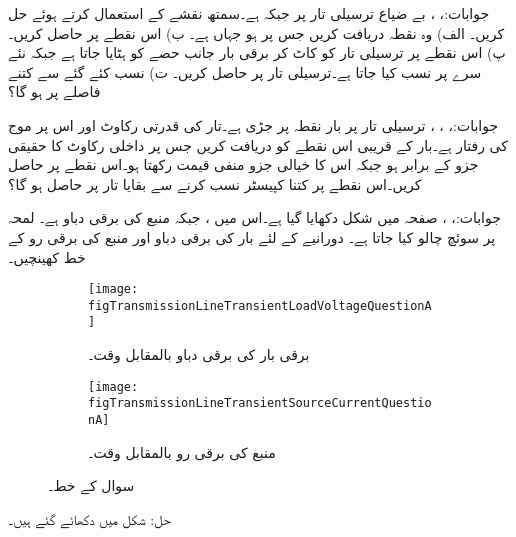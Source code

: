 جوابات:، ، 
بے ضیاع ترسیلی تار پر  جبکہ  ہے۔سمتھ نقشے کے استعمال کرتے ہوئے حل کریں۔ الف) وہ نقطہ دریافت کریں جس پر  ہو جہاں  ہے۔ ب) اس نقطے پر  حاصل کریں۔ پ) اس نقطے پر ترسیلی تار کو کاٹ کر برقی بار جانب حصے کو ہٹایا جاتا ہے جبکہ نئے سرے پر   نسب کیا جاتا ہے۔ترسیلی تار پر  حاصل کریں۔ ت) نسب کئے گئے  سے کتنے فاصلے پر  ہو گا؟

جوابات:، ، ، 
ترسیلی تار پر  بار نقطہ   پر جڑی ہے۔تار کی قدرتی رکاوٹ  اور اس پر موج کی رفتار  ہے۔بار کے قریبی اس نقطے کو دریافت کریں جس پر داخلی رکاوٹ کا حقیقی جزو  کے برابر ہو جبکہ اس کا خیالی جزو منفی قیمت رکھتا ہو۔اس نقطے پر 
 حاصل کریں۔اس نقطے پر کتنا کپیسٹر نسب کرنے سے بقایا تار پر  حاصل ہو گا؟ 

جوابات:، ، 
صفحہ  میں شکل  دکھایا گیا ہے۔اس میں ،  جبکہ منبع کی برقی دباو  ہے۔ لمحہ  پر سوئچ چالو کیا جاتا ہے۔ دورانیے کے لئے بار کی برقی دباو اور  منبع کی برقی رو کے خط کھینچیں۔

\begin{figure}
\centering
\begin{subfigure}{0.8\textwidth}
\centering
\texttt{[image: figTransmissionLineTransientLoadVoltageQuestionA]}
\caption{ برقی بار کی برقی دباو بالمقابل وقت۔}
\label{شکل_ترسیلی_جواب_سوال_الف}
\end{subfigure}%

\begin{subfigure}{0.8\textwidth}
\centering
\texttt{[image: figTransmissionLineTransientSourceCurrentQuestionA]}
\caption{منبع کی برقی رو بالمقابل وقت۔}
\label{شکل_ترسیلی_جواب_منبع_رو_سوال_الف}
\end{subfigure}%
\caption{سوال  کے خط۔}
\label{شکل_سوال_ترسیلی_سوال_الف}
\end{figure}
حل: شکل  میں دکھائے گئے ہیں۔


